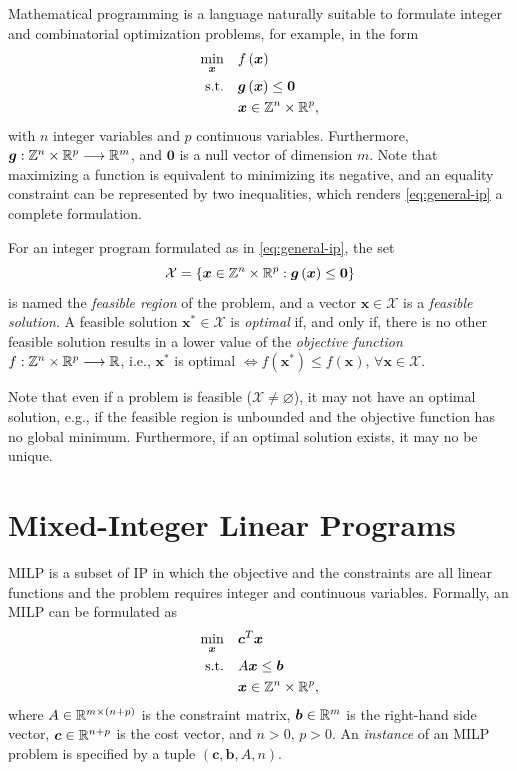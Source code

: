 Mathematical programming is a language naturally suitable to formulate integer and combinatorial optimization problems, for example, in the form
\begin{equation}\label{eq:general-ip}
    \begin{split}
	\min_{\bm{x}} \quad & f\left( \bm{x} \right) \\
	\textrm{s.t.} \quad & \bm{g}\left( \bm{x} \right) \le \bm{0} \\
	  & \bm{x} \in \mathbb{Z}^{n}\times \mathbb{R}^{p}
    ,\end{split}
\end{equation}
with $n$ integer variables and $p$ continuous variables.
Furthermore, $\bm{g}: \mathbb{Z}^{n}\times \mathbb{R}^{p} \longrightarrow \mathbb{R}^{m}$,  and $\bm{0}$ is a null vector of dimension $m$.
Note that maximizing a function is equivalent to minimizing its negative, and an equality constraint can be represented by two inequalities, which renders \eqref{eq:general-ip} a complete formulation.

For an integer program formulated as in \eqref{eq:general-ip}, the set \[
\mathcal{X}=\left\{ \bm{x}\in \mathbb{Z}^{n}\times \mathbb{R}^{p}: \bm{g}\left( \bm{x} \right) \le \bm{0}\right\} 
\] is named the \emph{feasible region} of the problem, and a vector $\bm{x}\in \mathcal{X}$ is a \emph{feasible solution}.
A feasible solution $\bm{x}^{*}\in \mathcal{X}$ is \emph{optimal} if, and only if, there is no other feasible solution results in a lower value of the \emph{objective function} $f: \mathbb{Z}^{n}\times \mathbb{R}^{p} \longrightarrow \mathbb{R}$, i.e., $\bm{x}^{*}$ is optimal $\iff f(\bm{x}^{*}) \le f(\bm{x}) ,\,\forall \bm{x}\in \mathcal{X}$.

Note that even if a problem is feasible ($\mathcal{X}\neq \varnothing$), it may not have an optimal solution, e.g., if the feasible region is unbounded and the objective function has no global minimum.
Furthermore, if an optimal solution exists, it may no be unique.

\section{Mixed-Integer Linear Programs}

MILP is a subset of IP in which the objective and the constraints are all linear functions and the problem requires integer and continuous variables.
Formally, an MILP can be formulated as 
\begin{equation}\label{eq:general-milp}
\begin{split}
    \min_{\bm{x}} \quad & \bm{c}^{T}\bm{x} \\
    \textrm{s.t.} \quad & A\bm{x} \le \bm{b} \\
	  & \bm{x} \in \mathbb{Z}^{n}\times \mathbb{R}^{p}
,\end{split}
\end{equation}
where $A\in \mathbb{R}^{m\times (n+p)}$ is the constraint matrix, $\bm{b}\in \mathbb{R}^{m}$ is the right-hand side vector, $\bm{c}\in \mathbb{R}^{n+p}$ is the cost vector, and $n>0$, $p>0$.
An \emph{instance} of an MILP problem is specified by a tuple  $\left( \bm{c},\bm{b},A,n \right)$.

